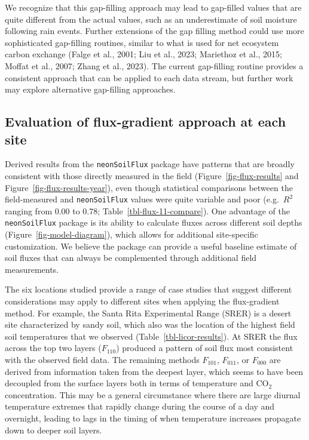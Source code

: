 \documentclass[
  letterpaper,
  DIV=11,
  numbers=noendperiod]{scrartcl}
\begin{document}
We recognize that this gap-filling approach may lead to gap-filled
values that are quite different from the actual values, such as an
underestimate of soil moisture following rain events. Further extensions
of the gap filling method could use more sophisticated gap-filling
routines, similar to what is used for net ecosystem carbon exchange
(Falge et al., 2001; Liu et al., 2023; Mariethoz et al., 2015; Moffat et
al., 2007; Zhang et al., 2023). The current gap-filling routine provides
a consistent approach that can be applied to each data stream, but
further work may explore alternative gap-filling approaches.

\subsection{Evaluation of flux-gradient approach at each
site}\label{evaluation-of-flux-gradient-approach-at-each-site}

Derived results from the \texttt{neonSoilFlux} package have patterns
that are broadly consistent with those directly measured in the field
(Figure~\ref{fig-flux-results} and Figure~\ref{fig-flux-results-year}),
even though statistical comparisons between the field-measured and
\texttt{neonSoilFlux} values were quite variable and poor
(e.g.~\(R^{2}\) ranging from 0.00 to 0.78;
Table~\ref{tbl-flux-11-compare}). One advantage of the
\texttt{neonSoilFlux} package is its ability to calculate fluxes across
different soil depths (Figure~\ref{fig-model-diagram}), which allows for
additional site-specific customization. We believe the package can
provide a useful baseline estimate of soil fluxes that can always be
complemented through additional field measurements.

The six locations studied provide a range of case studies that suggest
different considerations may apply to different sites when applying the
flux-gradient method. For example, the Santa Rita Experimental Range
(SRER) is a desert site characterized by sandy soil, which also was the
location of the highest field soil temperatures that we observed
(Table~\ref{tbl-licor-results}). At SRER the flux across the top two
layers (\(F_{110}\)) produced a pattern of soil flux most consistent
with the observed field data. The remaining methods \(F_{101}\),
\(F_{011}\), or \(F_{000}\) are derived from information taken from the
deepest layer, which seems to have been decoupled from the surface
layers both in terms of temperature and CO\(_{2}\) concentration. This
may be a general circumstance where there are large diurnal temperature
extremes that rapidly change during the course of a day and overnight,
leading to lags in the timing of when temperature increases propagate
down to deeper soil layers.
\end{document}
